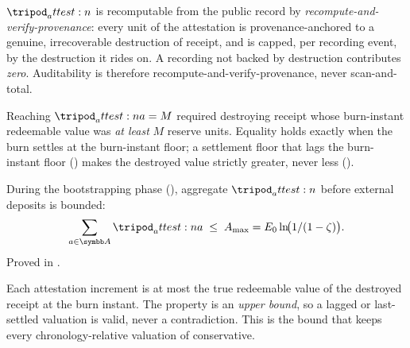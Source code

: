 \documentclass[../main.tex]{subfiles}
\begin{document}
\begin{postulate}
    \label{postc:interface:auditability}
    $\attest{}$ is recomputable from the public record by
    \emph{recompute-and-verify-provenance}: every unit of the attestation is
    provenance-anchored to a genuine, irrecoverable destruction of receipt, and is capped,
    per recording event, by the destruction it rides on. A recording not backed by
    destruction contributes \emph{zero}. Auditability is therefore
    recompute-and-verify-provenance, never scan-and-total.
\end{postulate}

\begin{theorem}
    \label{thm:interface:instantaneous-costliness}
    Reaching $\attest{a} = M$ required destroying receipt whose burn-instant redeemable
    value was \emph{at least} $M$ reserve units. Equality holds exactly when the burn
    settles at the burn-instant floor; a settlement floor that lags the burn-instant floor
    () makes the destroyed value strictly
    greater, never less ().
\end{theorem}

\begin{proposition}
    \label{prop:interface:bootstrap-capacity}
    During the bootstrapping phase (), aggregate
    $\attest{}$ before external deposits is bounded:
    \[
        \sum_{a \in \addrspace} \attest{a}
        \;\leq\;
        \attestcap = \genesisreserve \ln\!\bigl(1/(1-\livesplit)\bigr).
    \]
    Proved in .
\end{proposition}

\begin{proposition}
    \label{prop:interface:conservative-valuation}
    Each attestation increment is at most the true redeemable value of the destroyed
    receipt at the burn instant. The property is an \emph{upper bound}, so a lagged or
    last-settled valuation is valid, never a contradiction. This is the bound that keeps
    every chronology-relative valuation of  conservative.
\end{proposition}
\end{document}
